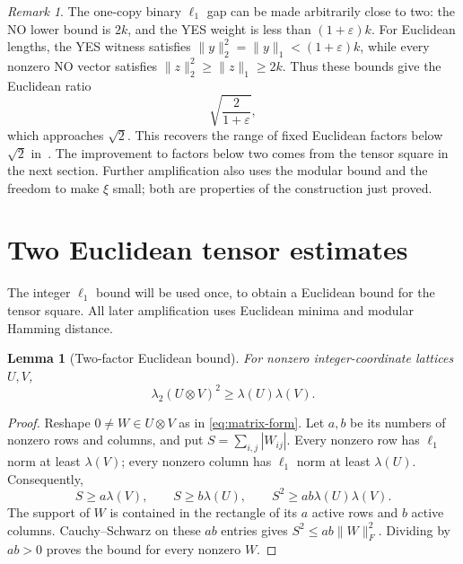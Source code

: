 \documentclass[11pt,letterpaper]{article}
\numberwithin{equation}{section}
\newtheorem{lemma}[theorem]{Lemma}
\theoremstyle{definition}
\theoremstyle{remark}
\newtheorem{remark}[theorem]{Remark}
\begin{document}
\begin{remark}\label{rem:binary-interface}
The one-copy binary $\ell_1$ gap can be made arbitrarily close to two: the NO lower bound is $2k$, and the YES weight is less than $(1+\varepsilon)k$. For Euclidean lengths, the YES witness satisfies $\|y\|_2^2=\|y\|_1<(1+\varepsilon)k$, while every nonzero NO vector satisfies $\|z\|_2^2\ge\|z\|_1\ge2k$. Thus these bounds give the Euclidean ratio
\[
 \sqrt{\frac{2}{1+\varepsilon}},
\]
which approaches $\sqrt2$. This recovers the range of fixed Euclidean factors below $\sqrt2$ in~\cite{wan}. The improvement to factors below two comes from the tensor square in the next section. Further amplification also uses the modular bound and the freedom to make $\xi$ small; both are properties of the construction just proved.
\end{remark}

\section{Two Euclidean tensor estimates}\label{sec:euclidean}
The integer $\ell_1$ bound will be used once, to obtain a Euclidean bound for the tensor square. All later amplification uses Euclidean minima and modular Hamming distance.

\begin{lemma}[Two-factor Euclidean bound]\label{lem:seed}
For nonzero integer-coordinate lattices $U,V$,
\begin{equation}\label{eq:seed}
 \lambda_2(U\otimes V)^2\ge\lambda(U)\lambda(V).
\end{equation}
\end{lemma}
\begin{proof}
Reshape $0\ne W\in U\otimes V$ as in \eqref{eq:matrix-form}. Let $a,b$ be its numbers of nonzero rows and columns, and put $S=\sum_{i,j}|W_{ij}|$. Every nonzero row has $\ell_1$ norm at least $\lambda(V)$; every nonzero column has $\ell_1$ norm at least $\lambda(U)$. Consequently,
\[
 S\ge a\lambda(V),\qquad S\ge b\lambda(U),
 \qquad S^2\ge ab\lambda(U)\lambda(V).
\]
The support of $W$ is contained in the rectangle of its $a$ active rows and $b$ active columns. Cauchy--Schwarz on these $ab$ entries gives $S^2\le ab\|W\|_F^2$. Dividing by $ab>0$ proves the bound for every nonzero $W$.
\end{proof}
\end{document}
